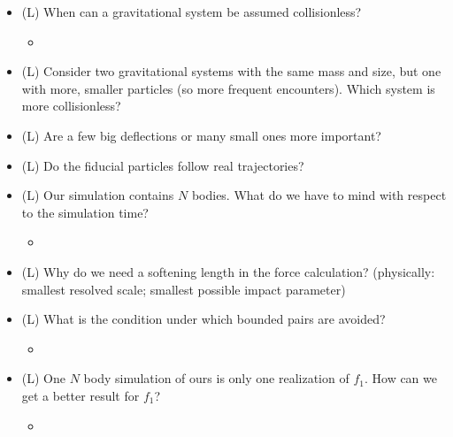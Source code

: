 \begin{itemize}
    \begin{itemize}
        \item {}
    \end{itemize}
    \item (L) When can a gravitational system be assumed collisionless?
    \begin{itemize}
        \item {}
    \end{itemize}
    \item (L) Consider two gravitational systems with the same mass and size, but one with more, smaller particles (so more frequent encounters).
    Which system is more collisionless?
    \item (L) Are a few big deflections or many small ones more important?
    \item (L) Do the fiducial particles follow real trajectories?
    \item (L) Our simulation contains $N$ bodies. What do we have to mind with respect to the simulation time?
    \begin{itemize}
        \item {}
    \end{itemize}
    \item (L) Why do we need a softening length in the force calculation? (physically: smallest resolved scale; smallest possible impact parameter)
    \item (L) What is the condition under which bounded pairs are avoided?
    \begin{itemize}
        \item {}
    \end{itemize}
    \item (L) One $N$ body simulation of ours is only one realization of $f_1$. How can we get
    a better result for $f_1$?
    \begin{itemize}
        \item {}
    \end{itemize}
\end{itemize}

